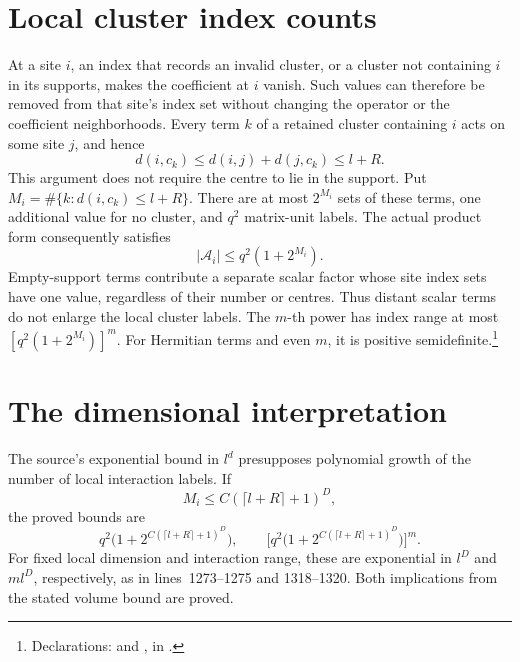 \documentclass{article}
\begin{document}
\section{Local cluster index counts}

At a site $i$, an index that records an invalid cluster, or a cluster
not containing $i$ in its supports, makes the coefficient at $i$ vanish.
Such values can therefore be removed from that site's index set without
changing the operator or the coefficient neighborhoods. Every term $k$
of a retained cluster containing $i$ acts on some site $j$, and hence
\[
 d(i,c_k)\le d(i,j)+d(j,c_k)\le l+R.
\]
This argument does not require the centre to lie in the support. Put
$M_i=\#\{k:d(i,c_k)\le l+R\}$. There are at most $2^{M_i}$ sets of
these terms, one additional value for no cluster, and $q^2$ matrix-unit
labels. The actual product form consequently satisfies
\[
 |\mathcal A_i|\le q^2(1+2^{M_i}).
\]
Empty-support terms contribute a separate scalar factor whose site
index sets have one value, regardless of their number or centres.
Thus distant scalar terms do not enlarge the local cluster labels.
The $m$-th power has index range at most
$[q^2(1+2^{M_i})]^m$. For Hermitian terms and even $m$, it is positive
semidefinite.\footnote{Declarations:
and
,
in .}

\section{The dimensional interpretation}

The source's exponential bound in $l^d$ presupposes polynomial growth
of the number of local interaction labels. If
\[
 M_i\le C(\lceil l+R\rceil+1)^D,
\]
the proved bounds are
\[
 q^2\bigl(1+2^{C(\lceil l+R\rceil+1)^D}\bigr),\qquad
 \bigl[q^2\bigl(1+2^{C(\lceil l+R\rceil+1)^D}\bigr)\bigr]^m.
\]
For fixed local dimension and interaction range, these are exponential
in $l^D$ and $ml^D$, respectively, as in lines~1273--1275 and
1318--1320. Both implications from the stated volume bound are proved.
\end{document}
